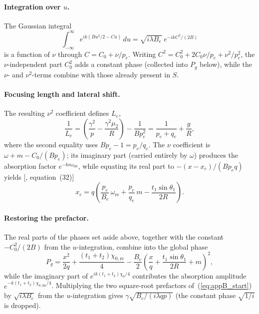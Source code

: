 \documentclass[preprint]{iucr}              %
\begin{document}
\paragraph*{Integration over $u$.}
The Gaussian integral
\begin{equation}
\int_{-\infty}^{\infty}e^{ik(Bu^2/2-Cu)}\,du=\sqrt{i\lambda B_e}\;e^{-ikC^2/(2B)}
\end{equation}
is a function of $\nu$ through $C=C_0+\nu/p_e$. Writing $C^2=C_0^2+2C_0\nu/p_e+\nu^2/p_e^2$, the $\nu$-independent part $C_0^2$ adds a constant phase (collected into $P_g$ below), while the $\nu$- and $\nu^2$-terms combine with those already present in $S$.

\paragraph*{Focusing length and lateral shift.}
The resulting $\nu^2$ coefficient defines $L_e$,
\begin{equation}
\frac{1}{L_e}=\left(\frac{\gamma^2}{p}-\frac{\gamma^2\mu_2}{R}\right)-\frac{1}{Bp_e^2}=\frac{1}{p_e+q_e}+\frac{g}{R},
\end{equation}
where the second equality uses $Bp_e-1=p_e/q_e$. The $\nu$ coefficient is $\omega+m-C_0/(Bp_e)$; its imaginary part (carried entirely by $\omega$) produces the absorption factor $e^{-k\nu\omega_\text{im}}$, while equating its real part to $-(x-x_c)/(Bp_eq)$ yields [\cite{GuigayFerrero2016}, equation~(32)]
\begin{equation}
x_c=q\left(\frac{p_e}{B_e}\,\omega_\text{re}+\frac{p_e}{q_e}\,m-\frac{t_1\sin\theta_1}{2R}\right).
\end{equation}

\paragraph*{Restoring the prefactor.}
The real parts of the phases set aside above, together with the constant $-C_0^2/(2B)$ from the $u$-integration, combine into the global phase
\begin{equation}
P_g=\frac{x^2}{2q}+\frac{(t_1+t_2)\chi_{0,\text{re}}}{4}-\frac{B_e}{2}\left(\frac{x}{q}+\frac{t_1\sin\theta_1}{2R}+m\right)^2,
\end{equation}
while the imaginary part of $e^{ik(t_1+t_2)\chi_0/4}$ contributes the absorption amplitude $e^{-k(t_1+t_2)\chi_{0,\text{im}}/4}$. Multiplying the two square-root prefactors of~(\ref{eq:appB_start}) by $\sqrt{i\lambda B_e}$ from the $u$-integration gives $\gamma\sqrt{B_e/(i\lambda qp)}$ (the constant phase $\sqrt{1/i}$ is dropped).
\end{document}
